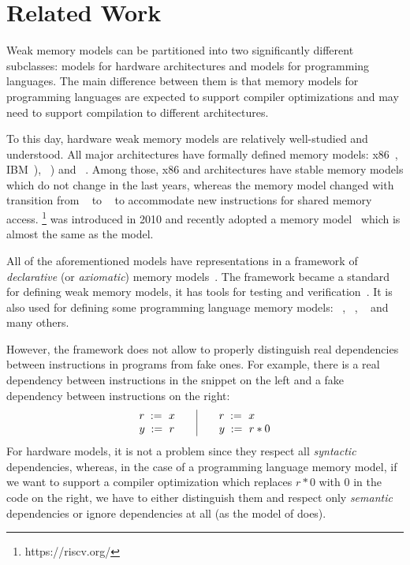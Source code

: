 \section{Related Work}
\label{sec:related}
Weak memory models can be partitioned into two significantly different subclasses:
models for hardware architectures and models for programming languages.
The main difference between them is that memory models for programming languages
are expected to support compiler optimizations and may need to support compilation
to different architectures.

To this day, hardware weak memory models are relatively well-studied and understood.
All major architectures have formally defined memory models:
x86~\cite{Sewell-al:CACM10},
IBM~\POWER \cite{Alglave-DAMP09,Sarkar-al:PLDI11,Alglave-al:TOPLAS14}),
\ARM~\cite{Chong-ASPLOS08, Alglave-DAMP09,Pulte-al:POPL18,Flur-al:POPL16,Alglave-al:TOPLAS14})
and \RISC~\cite{Pulte-al:POPL18}.
Among those, x86 and \POWER architectures have stable memory models which do not change in the last years,
whereas the \ARM memory model changed with transition from ~\cite{Alglave-al:TOPLAS14} to ~\cite{Pulte-al:POPL18}
to accommodate new instructions for shared memory access.
\RISC\footnote{https://riscv.org/} was introduced in 2010 and recently adopted a memory model~\cite{Pulte-al:POPL18}
which is almost the same as the  model.

All of the aforementioned models have representations in a framework of \emph{declarative} (or \emph{axiomatic})
memory models~\cite{Alglave-al:TOPLAS14}.
The framework became a standard for defining weak memory models, %
it has tools for testing and verification~\cite{Alglave-al:TOPLAS14}.
It is also used for defining some programming language memory models: 
\CPP~\cite{Batty-al:POPL11}, \JS~\cite{Watt-al:PLDI2020}, \OCaml~\cite{Manson-al:POPL05} and many others.

However, the framework does not allow to properly distinguish real dependencies between instructions in programs
from fake ones. For example, there is a real dependency between instructions in the snippet on the left
and a fake dependency between instructions on the right:
\[\begin{array}{l@{\qquad}|@{\qquad}l}
\readInst{}{r}{x} & \readInst{}{r}{x} \\
\writeInst{}{y}{r} & \readInst{}{y}{r * 0} \\
\end{array}\]
For hardware models, it is not a problem since they respect all \emph{syntactic} dependencies,
whereas, in the case of a programming language memory model,
if we want to support a compiler optimization which replaces $r * 0$ with $0$ in the code on the right,
we have to either distinguish them and respect only \emph{semantic} dependencies
or ignore dependencies at all (as the model of \CPP does).

